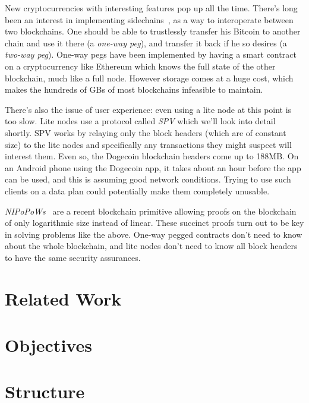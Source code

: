 New cryptocurrencies with interesting features pop up all the time. There's long been an interest in implementing sidechains~\cite{sidechains}, as a way to interoperate between two blockchains. One should be able to trustlessly transfer his Bitcoin to another chain and use it there (a \emph{one-way peg}), and transfer it back if he so desires (a \emph{two-way peg}). One-way pegs have been implemented by having a smart contract on a cryptocurrency like Ethereum which knows the full state of the other blockchain, much like a full node. However storage comes at a huge cost, which makes the hundreds of GBs of most blockchains infeasible to maintain.

There's also the issue of user experience: even using a lite node at this point is too slow. Lite nodes use a protocol called \emph{SPV} which we'll look into detail shortly. SPV works by relaying only the block headers (which are of constant size) to the lite nodes and specifically any transactions they might suspect will interest them. Even so, the Dogecoin blockchain headers come up to 188MB. On an Android phone using the Dogecoin app, it takes about an hour before the app can be used, and this is assuming good network conditions. Trying to use such clients on a data plan could potentially make them completely unusable.

\emph{NIPoPoWs}~\cite{nipopows} are a recent blockchain primitive allowing proofs on the blockchain of only logarithmic size instead of linear. These succinct proofs turn out to be key in solving problems like the above. One-way pegged contracts don't need to know about the whole blockchain, and lite nodes don't need to know all block headers to have the same security assurances.

\section{Related Work}
\section{Objectives}
\section{Structure}

